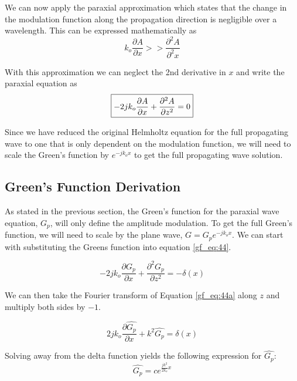  We can now apply the paraxial approximation which states that the change in the modulation function along the propagation direction is negligible over a wavelength. This can be expressed mathematically as
  \begin{equation}
k_o\frac{\partial A}{\partial x} >> \frac{\partial^2 A}{\partial^2 x}
\label{gf_eq:43}
\end{equation}
 \renewcommand{\baselinestretch}{2} \small\normalsize
 
 With this approximation we can neglect the 2nd derivative in $x$ and write the paraxial equation as
   \begin{equation}
\boxed{-2jk_o\frac{\partial A}{\partial x} + \frac{\partial^2 A}{\partial z^2} = 0} \\
\label{gf_eq:44}
\end{equation}
 \renewcommand{\baselinestretch}{2} \small\normalsize
 
Since we have reduced the original Helmholtz equation for the full propagating wave to one that is only dependent on the modulation function, we will need to scale the Green's function by $e^{-jk_ox}$ to get the full propagating wave solution.
 
\subsection{Green's Function Derivation}
As stated in the previous section, the Green's function for the paraxial wave equation, $G_p$, will only define the amplitude modulation. To get the full Green's function, we will need to scale by the plane wave, $G= G_p e^{-jk_ox}$. We can start with substituting the Greens function into equation \ref{gf_eq:44}.

\begin{equation}
-2jk_o\frac{\partial G_p}{\partial x} + \frac{\partial^2 G_p}{\partial z^2} = -\delta(x)
\label{gf_eq:44a}
\end{equation}

We can then take the Fourier transform of Equation \ref{gf_eq:44a} along $z$ and multiply both sides by $-1$.

\begin{equation}
2jk_o\frac{\partial \hat{G_p}}{\partial x} +k^2\hat{G_p} = \delta(x)
\label{gf_eq:45}
\end{equation}

Solving away from the delta function yields the following expression for $\hat{G_p}$:
\begin{equation}
\hat{G_p}= ce^{\frac{jk^2}{2k_o}x}
\label{gf_eq:46}
\end{equation}

